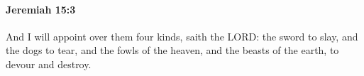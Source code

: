 
		\paragraph{Jeremiah 15:3} %
			\label{JEREMIAH-15-3}

			And I will appoint over them four kinds, saith the LORD: the sword to slay, and the dogs to tear, and the fowls of the heaven, and the beasts of the earth, to devour and destroy.


